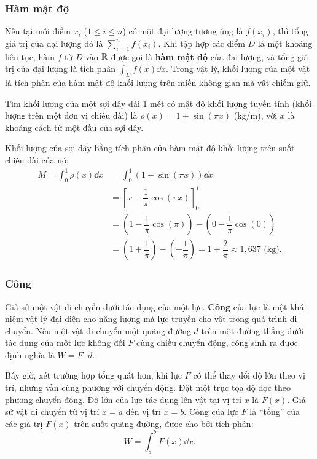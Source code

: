 \subsubsection{Hàm mật độ}
Nếu tại mỗi điểm $x_i$ ($1 \le i \le n$) có một đại lượng tương ứng là $f(x_i)$, thì tổng giá trị của đại lượng đó là $\sum_{i=1}^n f(x_i)$. Khi tập hợp các điểm $D$ là một khoảng liên tục, hàm $f$ từ $D$ vào $\mathbb{R}$ được gọi là \textbf{hàm mật độ} của đại lượng, và tổng giá trị của đại lượng là tích phân $\int_D f(x) \dd x$.
Trong vật lý, khối lượng của một vật là tích phân của hàm mật độ khối lượng trên miền không gian mà vật chiếm giữ.

\begin{example}
    Tìm khối lượng của một sợi dây dài 1 mét có mật độ khối lượng tuyến tính (khối lượng trên một đơn vị chiều dài) là $\rho(x) = 1 + \sin(\pi x)$ (kg/m), với $x$ là khoảng cách từ một đầu của sợi dây.
\end{example}
\begin{solution}
    Khối lượng của sợi dây bằng tích phân của hàm mật độ khối lượng trên suốt chiều dài của nó:
    \begin{align*}
        M = \int_0^1 \rho(x) \dd x &= \int_0^1 (1 + \sin(\pi x)) \dd x \\
        &= \left[ x - \dfrac{1}{\pi}\cos(\pi x) \right]_0^1 \\
        &= \left( 1 - \dfrac{1}{\pi}\cos(\pi) \right) - \left( 0 - \dfrac{1}{\pi}\cos(0) \right) \\
        &= \left( 1 + \dfrac{1}{\pi} \right) - \left( -\dfrac{1}{\pi} \right) = 1 + \dfrac{2}{\pi} \approx 1,637 \text{ (kg)}.
    \end{align*}
\end{solution}

\subsubsection{Công}
Giả sử một vật di chuyển dưới tác dụng của một lực. \textbf{Công} của lực là một khái niệm vật lý đại diện cho năng lượng mà lực truyền cho vật trong quá trình di chuyển.
Nếu một vật di chuyển một quãng đường $d$ trên một đường thẳng dưới tác dụng của một lực không đổi $F$ cùng chiều chuyển động, công sinh ra được định nghĩa là $W = F \cdot d$.

Bây giờ, xét trường hợp tổng quát hơn, khi lực $F$ có thể thay đổi độ lớn theo vị trí, nhưng vẫn cùng phương với chuyển động. Đặt một trục tọa độ dọc theo phương chuyển động. Độ lớn của lực tác dụng lên vật tại vị trí $x$ là $F(x)$. Giả sử vật di chuyển từ vị trí $x=a$ đến vị trí $x=b$. Công của lực $F$ là ``tổng'' của các giá trị $F(x)$ trên suốt quãng đường, được cho bởi tích phân:
\[ W = \int_a^b F(x) \dd x. \]

